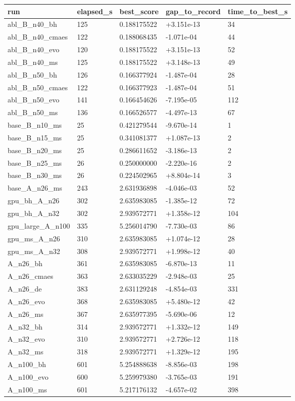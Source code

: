 \begin{tabular}{lllll}
\hline
run & elapsed\_s & best\_score & gap\_to\_record & time\_to\_best\_s \\
\hline
abl\_B\_n40\_bh & 125 & 0.188175522 & +3.151e-13 & 34 \\
abl\_B\_n40\_cmaes & 122 & 0.188068435 & -1.071e-04 & 44 \\
abl\_B\_n40\_evo & 120 & 0.188175522 & +3.151e-13 & 52 \\
abl\_B\_n40\_ms & 125 & 0.188175522 & +3.148e-13 & 49 \\
abl\_B\_n50\_bh & 126 & 0.166377924 & -1.487e-04 & 28 \\
abl\_B\_n50\_cmaes & 122 & 0.166377923 & -1.487e-04 & 51 \\
abl\_B\_n50\_evo & 141 & 0.166454626 & -7.195e-05 & 112 \\
abl\_B\_n50\_ms & 136 & 0.166526577 & -4.497e-13 & 67 \\
base\_B\_n10\_ms & 25 & 0.421279544 & -9.670e-14 & 1 \\
base\_B\_n15\_ms & 25 & 0.341081377 & +1.087e-13 & 2 \\
base\_B\_n20\_ms & 25 & 0.286611652 & -3.186e-13 & 2 \\
base\_B\_n25\_ms & 26 & 0.250000000 & -2.220e-16 & 2 \\
base\_B\_n30\_ms & 26 & 0.224502965 & +8.804e-14 & 3 \\
base\_A\_n26\_ms & 243 & 2.631936898 & -4.046e-03 & 52 \\
gpu\_bh\_A\_n26 & 302 & 2.635983085 & -1.385e-12 & 72 \\
gpu\_bh\_A\_n32 & 302 & 2.939572771 & +1.358e-12 & 104 \\
gpu\_large\_A\_n100 & 335 & 5.256014790 & -7.730e-03 & 86 \\
gpu\_ms\_A\_n26 & 310 & 2.635983085 & +1.074e-12 & 28 \\
gpu\_ms\_A\_n32 & 308 & 2.939572771 & +1.998e-12 & 40 \\
A\_n26\_bh & 361 & 2.635983085 & -6.870e-13 & 11 \\
A\_n26\_cmaes & 363 & 2.633035229 & -2.948e-03 & 25 \\
A\_n26\_de & 383 & 2.631129248 & -4.854e-03 & 331 \\
A\_n26\_evo & 368 & 2.635983085 & +5.480e-12 & 42 \\
A\_n26\_ms & 367 & 2.635977395 & -5.690e-06 & 12 \\
A\_n32\_bh & 314 & 2.939572771 & +1.332e-12 & 149 \\
A\_n32\_evo & 310 & 2.939572771 & +2.726e-12 & 118 \\
A\_n32\_ms & 318 & 2.939572771 & +1.329e-12 & 195 \\
A\_n100\_bh & 601 & 5.254888638 & -8.856e-03 & 198 \\
A\_n100\_evo & 600 & 5.259979380 & -3.765e-03 & 191 \\
A\_n100\_ms & 601 & 5.217176132 & -4.657e-02 & 398 \\
\hline
\end{tabular}
